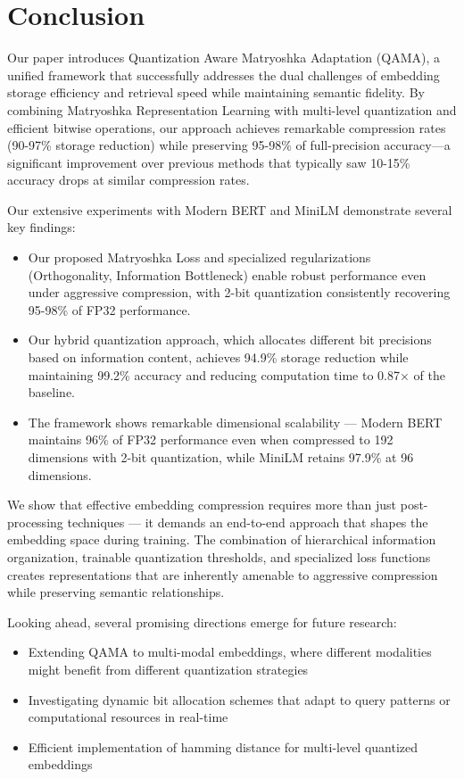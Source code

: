 \section{Conclusion}
\label{sec:conclusion}

Our paper introduces Quantization Aware Matryoshka Adaptation (QAMA), a unified framework that successfully addresses the dual challenges of embedding storage efficiency and retrieval speed while maintaining semantic fidelity. 
By combining Matryoshka Representation Learning with multi-level quantization and efficient bitwise operations, our approach achieves remarkable compression rates (90-97\% storage reduction) while preserving 95-98\% of full-precision accuracy—a significant improvement over previous methods that typically saw 10-15\% accuracy drops at similar compression rates.

Our extensive experiments with Modern BERT and MiniLM demonstrate several key findings:
\begin{itemize}
    \item Our proposed Matryoshka Loss and specialized regularizations (Orthogonality, Information Bottleneck) enable robust performance even under aggressive compression, with 2-bit quantization consistently recovering 95-98\% of FP32 performance.
    \item Our hybrid quantization approach, which allocates different bit precisions based on information content, achieves 94.9\% storage reduction while maintaining 99.2\% accuracy and reducing computation time to 0.87× of the baseline.
    \item The framework shows remarkable dimensional scalability — Modern BERT maintains 96\% of FP32 performance even when compressed to 192 dimensions with 2-bit quantization, while MiniLM retains 97.9\% at 96 dimensions.
\end{itemize}

We show that effective embedding compression requires more than just post-processing techniques — it demands an end-to-end approach that shapes the embedding space during training. 
The combination of hierarchical information organization, trainable quantization thresholds, and specialized loss functions creates representations that are inherently amenable to aggressive compression while preserving semantic relationships.

Looking ahead, several promising directions emerge for future research:
\begin{itemize}
    \item Extending QAMA to multi-modal embeddings, where different modalities might benefit from different quantization strategies
    \item Investigating dynamic bit allocation schemes that adapt to query patterns or computational resources in real-time
    \item Efficient implementation of hamming distance for multi-level quantized embeddings
\end{itemize}

